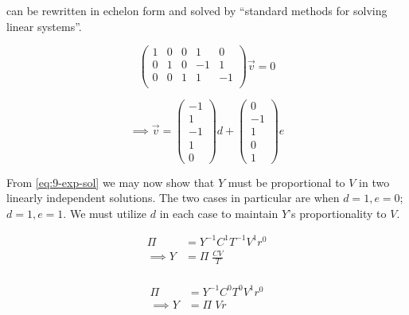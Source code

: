 \documentclass[12pt]{article}
\begin{document}
   can be rewritten in echelon form and solved by ``standard
  methods for solving linear systems''.

  \begin{equation}
    \label{eq:9-matrix}
    \begin{pmatrix}
      1 & 0 & 0 & 1 & 0 \\
      0 & 1 & 0 & -1 & 1 \\
      0 & 0 & 1 & 1 & -1 \\
    \end{pmatrix}
    \vec{v} = 0
  \end{equation}

  \begin{equation}
    \label{eq:9-exp-sol}
    \implies
    \vec{v} =
    \begin{pmatrix}
      -1 \\ 1 \\ -1 \\ 1 \\ 0
    \end{pmatrix}d +
    \begin{pmatrix}
      0 \\ -1 \\ 1 \\ 0 \\ 1
    \end{pmatrix}e
  \end{equation}

  From \cref{eq:9-exp-sol} we may now show that $Y$ must be proportional to $V$
  in two linearly independent solutions. The two cases in particular are when
  $d=1, e=0$; $d=1, e=1$. We must utilize $d$ in each case to maintain $Y$'s
  proportionality to $V$.

  \begin{multicols}{2}
    \begin{equation}
      \label{eq:9-sol-1}
      \boxed{
      \begin{aligned}
        \Pi &= Y^{-1} C^{1} T^{-1} V^1 r^0 \\
        \implies Y &= \Pi\;\frac{CV}{T} \\
      \end{aligned}
      }
    \end{equation}

    \begin{equation}
      \label{eq:9-sol-2}
      \boxed{
      \begin{aligned}
        \Pi &= Y^{-1} C^{0} T^{0} V^1 r^0 \\
        \implies Y &= \Pi\; Vr \\
      \end{aligned}
      }
    \end{equation}
  \end{multicols}
\end{document}
